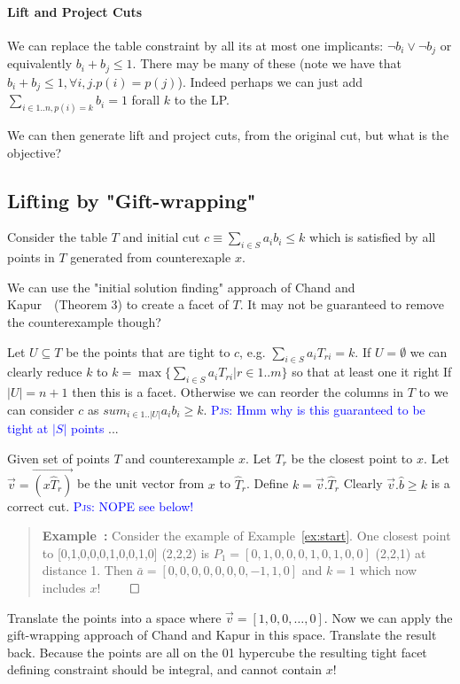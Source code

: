 \documentclass{article}
\newcounter{excount}
\newenvironment{example}{\begin{quote}\refstepcounter{excount}\textbf{Example~\arabic{excount}:}}{\hfill$\qed$\end{quote}}
\newcommand{\pjs}[1]{\textcolor{blue}{\textsc{Pjs:} #1}}
\begin{document}
{\paragraph{Lift and Project Cuts}

We can replace the table constraint by all its at most one implicants:
$\neg b_i \vee \neg b_j$ or equivalently $b_i + b_j \leq 1$.
There may be many of these (note we have that $b_i + b_j \leq 1, \forall i,j. p(i) = p(j)$).
Indeed perhaps we can just add $\sum_{i \in 1..n, p(i) = k} b_i = 1$ forall $k$ 
to the LP. 

We can then generate lift and project cuts, from the original cut, but what is the objective? 
}

\subsection{Lifting by "Gift-wrapping"}

Consider the table $T$ and initial cut 
$c \equiv \sum_{i \in S} a_i b_i \leq k$
which is satisfied by all points in $T$
generated from counterexaple $x$. 

We can use the "initial solution finding" approach of Chand and Kapur~\cite{chandkapur}~(Theorem 3) to create a facet of $T$. It may not be guaranteed to remove the counterexample though?

Let $U \subseteq T$ be the points that are tight to $c$, e.g. $\sum_{i \in S} a_i T_{ri} = k$. 
If $U = \emptyset$ we can clearly reduce $k$ 
to $k = \max\{ \sum_{i \in S} a_i T_{ri} | r \in 1..m \}$ so that at least one it right
If $|U| = n+1$ then this is a facet. 
Otherwise we can reorder the columns in $T$ to we can consider $c$ as
$sum_{i \in 1..|U|} a_i b_i \geq k$.
\pjs{Hmm why is this guaranteed to be tight at $|S|$ points} ...

Given set of points $T$ and counterexample $x$.
Let $T_r$ be the closest point to $x$. 
Let $\vec{v} = \vec{(x\hat{T}_r)}$ be the unit vector from $x$ to $\hat{T}_r$. Define $k = \vec{v}.\hat{T}_r$
Clearly $\vec{v}. \hat{b} \geq k$ is a correct cut. \pjs{NOPE see below!} 
\begin{example}
    Consider the example of Example~\ref{ex:start}. 
    One closest point to [0,1,0,0,0,1,0,0,1,0] (2,2,2) is
    $P_1 = [0,1,0,0,0,1,0,1,0,0]$ (2,2,1) at distance 1.
    Then $\bar{a} = [0,0,0,0,0,0,0,-1,1,0]$ and $k = 1$
    which now includes $x$! 
\end{example}

Translate the points into a space where $\vec{v} = [1,0,0,\ldots,0]$.
Now we can apply the gift-wrapping approach of Chand and Kapur 
in this space. Translate the result back. Because the points are all on the 01 hypercube the resulting tight facet defining constraint should be integral, and cannot contain $x$!
\end{document}
